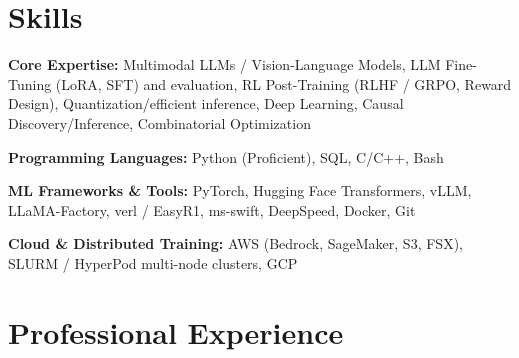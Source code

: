 \documentclass[]{Keval-resume}
\begin{document}
\section{Skills} 
\hrulefill
\postsectionsep
\begin{cvitems}
\item
{\textbf{Core Expertise:} Multimodal LLMs / Vision-Language Models, LLM Fine-Tuning (LoRA, SFT) and evaluation, RL Post-Training (RLHF / GRPO, Reward Design), Quantization/efficient inference, Deep Learning, Causal Discovery/Inference, Combinatorial Optimization}
\item
    {\textbf{Programming Languages:} Python (Proficient), SQL, C/C++, Bash}
\item
    {\textbf{ML Frameworks \& Tools:} PyTorch, Hugging Face Transformers, vLLM, LLaMA-Factory, verl / EasyR1, ms-swift, DeepSpeed, Docker, Git}
\item
    {\textbf{Cloud \& Distributed Training:} AWS (Bedrock, SageMaker, S3, FSX), SLURM / HyperPod multi-node clusters, GCP}
\end{cvitems}
\sectionsep

\section{Professional Experience} 
\hrulefill
\postsectionsep 
\end{document}
